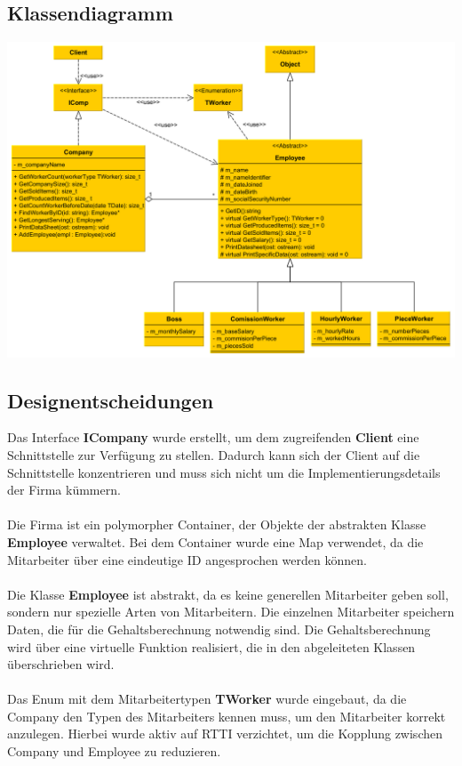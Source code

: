 \documentclass[12pt,naustrian,a4widepaper]{scrartcl}
\begin{document}
\subsection{Klassendiagramm}
\includegraphics[width=14cm]{./Images/UML_Diagramm.png}
\newpage

\subsection{Designentscheidungen}

Das Interface \textbf{ICompany} wurde erstellt, um dem zugreifenden \textbf{Client} eine Schnittstelle zur Verfügung zu stellen.
Dadurch kann sich der Client auf die Schnittstelle konzentrieren und muss sich nicht um die Implementierungsdetails der Firma kümmern.
\\
\\
Die Firma ist ein polymorpher Container, der Objekte der abstrakten Klasse \textbf{Employee} verwaltet.
Bei dem Container wurde eine Map verwendet, da die Mitarbeiter über eine eindeutige ID angesprochen werden können.
\\
\\
Die Klasse \textbf{Employee} ist abstrakt, da es keine generellen Mitarbeiter geben soll, sondern nur spezielle Arten von Mitarbeitern.
Die einzelnen Mitarbeiter speichern Daten, die für die Gehaltsberechnung notwendig sind. 
Die Gehaltsberechnung wird über eine virtuelle Funktion realisiert, die in den abgeleiteten Klassen überschrieben wird.
\\
\\
Das Enum mit dem Mitarbeitertypen \textbf{TWorker} wurde eingebaut, da die Company den Typen des Mitarbeiters kennen muss, um den Mitarbeiter korrekt anzulegen.
Hierbei wurde aktiv auf RTTI verzichtet, um die Kopplung zwischen Company und Employee zu reduzieren.
\end{document}
